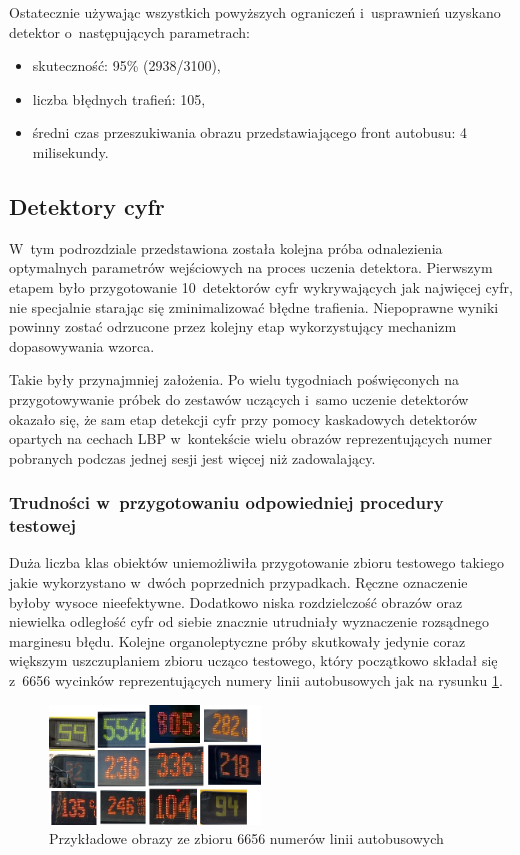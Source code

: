 Ostatecznie używając wszystkich powyższych ograniczeń i~usprawnień uzyskano detektor
o~następujących parametrach:
\begin{itemize}
	\item skuteczność: 95\% (2938/3100),
	\item liczba błędnych trafień: 105,
	\item średni czas przeszukiwania obrazu przedstawiającego front autobusu: 4 milisekundy.
\end{itemize}

\subsection{Detektory cyfr}

W~tym podrozdziale przedstawiona została kolejna próba
odnalezienia optymalnych
parametrów wejściowych na proces uczenia detektora.
Pierwszym etapem było przygotowanie 10~detektorów cyfr
wykrywających jak najwięcej cyfr, nie specjalnie starając się zminimalizować
błędne trafienia. Niepoprawne wyniki powinny zostać odrzucone
przez kolejny etap wykorzystujący mechanizm dopasowywania wzorca.

Takie były przynajmniej założenia. Po wielu tygodniach poświęconych
na przygotowywanie próbek do zestawów uczących i~samo uczenie
detektorów okazało się, że sam etap detekcji cyfr przy pomocy kaskadowych
detektorów opartych na cechach LBP w~kontekście wielu obrazów reprezentujących
numer pobranych podczas jednej sesji jest więcej niż zadowalający.

\subsubsection{Trudności w~przygotowaniu odpowiedniej procedury testowej}

Duża liczba klas obiektów uniemożliwiła przygotowanie zbioru testowego
takiego jakie wykorzystano w~dwóch poprzednich przypadkach. 
Ręczne oznaczenie byłoby wysoce nieefektywne. Dodatkowo 
niska rozdzielczość obrazów oraz niewielka odległość cyfr od siebie
znacznie utrudniały wyznaczenie rozsądnego marginesu błędu.
Kolejne organoleptyczne próby skutkowały jedynie coraz większym uszczuplaniem
zbioru ucząco testowego, który początkowo składał się 
z~6656 wycinków reprezentujących numery linii autobusowych
jak na rysunku \ref{fig:number_test_sample}.

\begin{figure}[!h]
	\centering
	\includegraphics[width=0.5\textwidth]{img/number_test_sample}
	\caption{Przykładowe obrazy ze zbioru 6656 numerów linii autobusowych}
	\label{fig:number_test_sample}
\end{figure}

